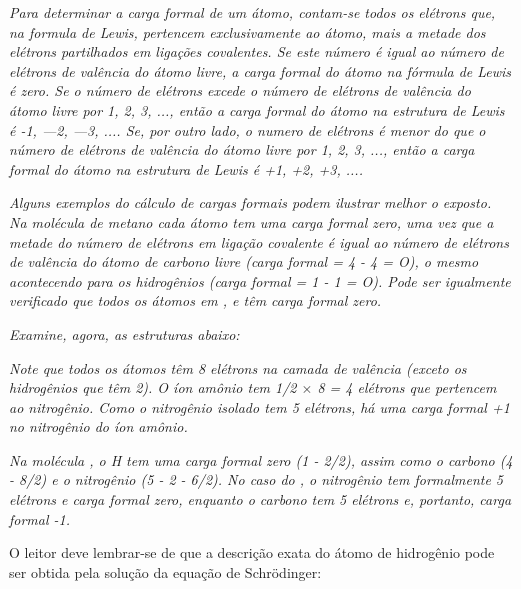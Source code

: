 \emph{Para determinar a carga formal de um átomo, contam-se todos os elétrons que, na formula de Lewis, pertencem exclusivamente ao átomo, mais a metade dos elétrons partilhados em ligações covalentes. Se este número é igual ao número de elétrons de valência do átomo livre, a carga formal do átomo na fórmula de Lewis é zero. Se o número de elétrons excede o número de elétrons de valência do átomo livre por 1, 2, 3, ..., então a carga formal do átomo na estrutura de Lewis é -1, —2, —3, .... Se, por outro lado, o numero de elétrons é menor do que o número de elétrons de valência do átomo livre por 1, 2, 3, ..., então a carga formal do átomo na estrutura de Lewis é +1, +2, +3, ....}

\emph{Alguns exemplos do cálculo de cargas formais podem ilustrar melhor o exposto. Na molécula de metano cada átomo tem uma carga formal zero, uma vez que a metade do número de elétrons em ligação covalente é igual ao número de elétrons de valência do átomo de carbono livre (carga formal = 4 - 4 = O), o mesmo acontecendo para os hidrogênios (carga formal = 1 - 1 = O). Pode ser igualmente verificado que todos os átomos em ,  e  têm carga formal zero.}

\emph{Examine, agora, as estruturas abaixo:}

\begin{tightcenter}
    \chemnameinit{}
    \qquad
    \chemnameinit{}
    \qquad 
\end{tightcenter}


\emph{Note que todos os átomos têm 8 elétrons na camada de valência (exceto os hidrogênios que têm 2). O íon amônio tem 1/2 $\times$ 8 = 4 elétrons que pertencem ao nitrogênio. Como o nitrogênio isolado tem 5 elétrons, há uma carga formal +1 no nitrogênio do íon amônio.}

\emph{Na molécula , o H tem uma carga formal zero (1 - 2/2), assim como o carbono (4 - 8/2) e o nitrogênio (5 - 2 - 6/2). No caso do , o nitrogênio tem formalmente 5 elétrons e carga formal zero, enquanto o carbono tem 5 elétrons e, portanto, carga formal -1.}

\par\bigskip
O leitor deve lembrar-se de que a descrição exata do átomo de hidrogênio pode ser obtida pela solução da equação de Schrödinger: 

